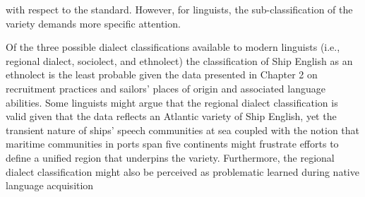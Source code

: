 \begin{styleStandard}
with respect to the standard. However, for linguists, the sub-classification of the variety demands more specific attention. 
\end{styleStandard}


\begin{styleStandard}
Of the three possible dialect classifications available to modern linguists (i.e., regional dialect, sociolect, and ethnolect) the classification of Ship English as an ethnolect is the least probable given the data presented in Chapter 2 on recruitment practices and sailors’ places of origin and associated language abilities. Some linguists might argue that the regional dialect classification is valid given that the data reflects an Atlantic variety of Ship English, yet the transient nature of ships’ speech communities at sea coupled with the notion that maritime communities in ports span five continents might frustrate efforts to define a unified region that underpins the variety. Furthermore, the regional dialect classification might also be perceived as problematic\textbf{ }learned during native language acquisition
\end{styleStandard}


